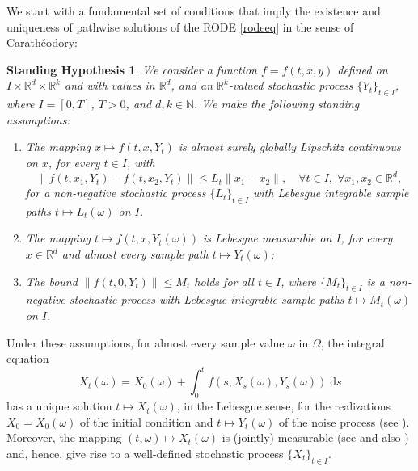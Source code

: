 \documentclass[reqno,12pt]{amsart}
\theoremstyle{plain} %
\newtheorem{stdhyp}{Standing Hypothesis}[section]
\theoremstyle{definition} %
\begin{document}
We start with a fundamental set of conditions that imply the existence and uniqueness of pathwise solutions of the RODE \eqref{rodeeq} in the sense of Carath\'eodory:
\begin{stdhyp}
    \label{standinghypotheses1}
    We consider a function $f=f(t, x, y)$ defined on $I\times \mathbb{R}^d\times\mathbb{R}^k$ and with values in $\mathbb{R}^d$, and an $\mathbb{R}^k$-valued stochastic process $\{Y_t\}_{t\in I}$, where $I=[0, T]$, $T > 0$, and $d, k\in \mathbb{N}.$ We make the following standing assumptions:
    \begin{enumerate}
        \item \label{standinghypothesesLipschitzbound} The mapping $x \mapsto f(t, x, Y_t)$ is almost surely globally Lipschitz continuous on $x$, for every $t\in I$, with
        \begin{equation}
            \label{Ltassumptionbasic}
            \|f(t, x_1, Y_t) - f(t, x_2, Y_t)\| \leq L_t \|x_1 - x_2\|, \quad \forall t \in I, \;\forall x_1, x_2 \in\mathbb{R}^d,
        \end{equation}
        for a non-negative stochastic process $\{L_t\}_{t\in I}$ with Lebesgue integrable sample paths $t\mapsto L_t(\omega)$ on $I$.
        
        \item The mapping $t \mapsto f(t, x, Y_t(\omega))$ is Lebesgue measurable on $I$, for every $x\in \mathbb{R}^d$ and almost every sample path $t \mapsto Y_t(\omega)$;
        
        \item \label{standinghypothesesMbound} The bound $\|f(t, 0, Y_t)\| \leq M_t$ holds for all $t\in I$, where $\{M_t\}_{t\in I}$ is a non-negative stochastic process with Lebesgue integrable sample paths $t\mapsto M_t(\omega)$ on $I$.
    \end{enumerate}
\end{stdhyp}

Under these assumptions, for almost every sample value $\omega$ in $\Omega$, the integral equation
\begin{equation}
    \label{integralrodeform}
    X_t(\omega) = X_0(\omega) + \int_0^t f(s, X_s(\omega), Y_s(\omega)) \;\mathrm{d}s
\end{equation}
has a unique solution $t\mapsto X_t(\omega)$, in the Lebesgue sense, for the realizations $X_0 = X_0(\omega)$ of the initial condition and $t\mapsto Y_t(\omega)$ of the noise process (see \cite[Theorem 1.1]{CoddingtonLevinson1985}). Moreover, the mapping $(t, \omega) \mapsto X_t(\omega)$ is (jointly) measurable (see \cite[Section 2.1.2]{HanKloeden2017} and also \cite[Lemma 4.51]{AB2006}) and, hence, give rise to a well-defined stochastic process $\{X_t\}_{t\in I}$.
\end{document}
